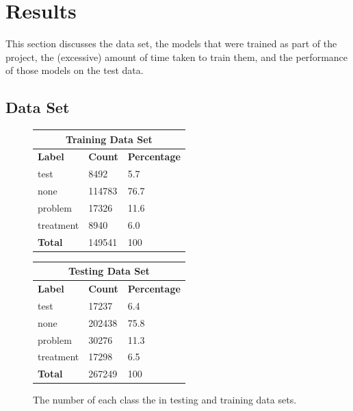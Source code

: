 \documentclass[preprint]{style}
\begin{document}
\section{Results}
This section discusses the data set, the models that were trained as part of the project, the (excessive) amount of time taken to train them, and the performance of those models on the test data.

\subsection{Data Set}

\begin{figure}[t]
\begin{center}
\begin{center}
	\begin{tabular}{|l|l|l|}
	\hline
	\multicolumn{3}{|c|}{\bf Training Data Set} \\ \hline
	{\bf Label} & {\bf Count} & {\bf Percentage} \\ \hline
	test & 8492 & 5.7\\ \hline
	none & 114783 & 76.7\\ \hline
	 problem & 17326 & 11.6\\ \hline
	 treatment & 8940 & 6.0\\ \hline
	 {\bf Total} & 149541 & 100\\ \hline
	\end{tabular}
\end{center}

\begin{center}
	\begin{tabular}{|l|l|l|}
	\hline
	\multicolumn{3}{|c|}{\bf Testing Data Set} \\ \hline
	{\bf Label} & {\bf Count} & {\bf Percentage} \\ \hline
	test & 17237 & 6.4\\ \hline
	none & 202438 & 75.8\\ \hline
	 problem & 30276 & 11.3\\ \hline
	 treatment & 17298 & 6.5\\ \hline
	 {\bf Total} & 267249 & 100\\ \hline
	\end{tabular}
\end{center}
\end{center}
\caption{The number of each class the in testing and training data sets.}
\label{fig:data_set_counts}
\end{figure}
\end{document}
